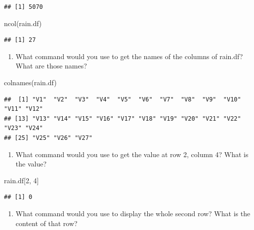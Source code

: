 \documentclass[
]{article}
\newenvironment{Shaded}{\begin{snugshade}}{\end{snugshade}}
\newcommand{\DecValTok}[1]{\textcolor[rgb]{0.00,0.00,0.81}{#1}}
\newcommand{\FunctionTok}[1]{\textcolor[rgb]{0.00,0.00,0.00}{#1}}
\newcommand{\NormalTok}[1]{#1}
\providecommand{\tightlist}{%
  \setlength{\itemsep}{0pt}\setlength{\parskip}{0pt}}
\begin{document}
\begin{verbatim}
## [1] 5070
\end{verbatim}

\begin{Shaded}
\begin{Highlighting}[]
\FunctionTok{ncol}\NormalTok{(rain.df)}
\end{Highlighting}
\end{Shaded}

\begin{verbatim}
## [1] 27
\end{verbatim}

\begin{enumerate}
\def\labelenumi{\alph{enumi}.}
\setcounter{enumi}{2}
\tightlist
\item
  What command would you use to get the names of the columns of rain.df?
  What are those names?
\end{enumerate}

\begin{Shaded}
\begin{Highlighting}[]
\FunctionTok{colnames}\NormalTok{(rain.df)}
\end{Highlighting}
\end{Shaded}

\begin{verbatim}
##  [1] "V1"  "V2"  "V3"  "V4"  "V5"  "V6"  "V7"  "V8"  "V9"  "V10" "V11" "V12"
## [13] "V13" "V14" "V15" "V16" "V17" "V18" "V19" "V20" "V21" "V22" "V23" "V24"
## [25] "V25" "V26" "V27"
\end{verbatim}

\begin{enumerate}
\def\labelenumi{\alph{enumi}.}
\setcounter{enumi}{3}
\tightlist
\item
  What command would you use to get the value at row 2, column 4? What
  is the value?
\end{enumerate}

\begin{Shaded}
\begin{Highlighting}[]
\NormalTok{rain.df[}\DecValTok{2}\NormalTok{, }\DecValTok{4}\NormalTok{]}
\end{Highlighting}
\end{Shaded}

\begin{verbatim}
## [1] 0
\end{verbatim}

\begin{enumerate}
\def\labelenumi{\alph{enumi}.}
\setcounter{enumi}{4}
\tightlist
\item
  What command would you use to display the whole second row? What is
  the content of that row?
\end{enumerate}
\end{document}
